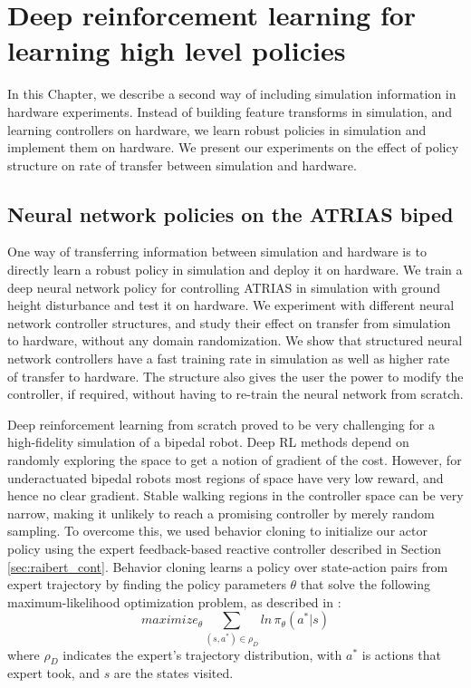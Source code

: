 \chapter{Deep reinforcement learning for learning high level policies}

\label{chap:deep}

In this Chapter, we describe a second way of including simulation information in hardware experiments. Instead of building feature transforms in simulation, and learning controllers on hardware, we learn robust policies in simulation and implement them on hardware. We present our experiments on the effect of policy structure on rate of transfer between simulation and hardware.

\section{Neural network policies on the ATRIAS biped}

One way of transferring information between simulation and hardware is to directly learn a robust policy in simulation and deploy it on hardware. We train a deep neural network policy for controlling ATRIAS in simulation with ground height disturbance and test it on hardware. We experiment with different neural network controller structures, and study their effect on transfer from simulation to hardware, without any domain randomization. We show that structured neural network controllers have a fast training rate in simulation as well as higher rate of transfer to hardware. The structure also gives the user the power to modify the controller, if required, without having to re-train the neural network from scratch.

Deep reinforcement learning from scratch proved to be very challenging for a high-fidelity simulation of a bipedal robot. Deep RL methods depend on randomly exploring the space to get a notion of gradient of the cost. However, for underactuated bipedal robots most regions of space have very low reward, and hence no clear gradient. Stable walking regions in the controller space can be very narrow, making it unlikely to reach a promising controller by merely random sampling. To overcome this, we used behavior cloning to initialize our actor policy using the expert feedback-based reactive controller described in Section \ref{sec:raibert_cont}. Behavior cloning learns a policy over state-action pairs from expert trajectory by finding the policy parameters $\theta$ that solve the following maximum-likelihood optimization problem, as described in  \cite{rajeswaran2017learning}: 
\begin{equation}
    maximize_\theta \sum_{(s,a^*) \in \rho_D} ln \, \pi_\theta (a^*|s)
\end{equation}
where $\rho_D$ indicates the expert's trajectory distribution, with  $a^*$ is actions that expert took, and $s$ are the states visited.


